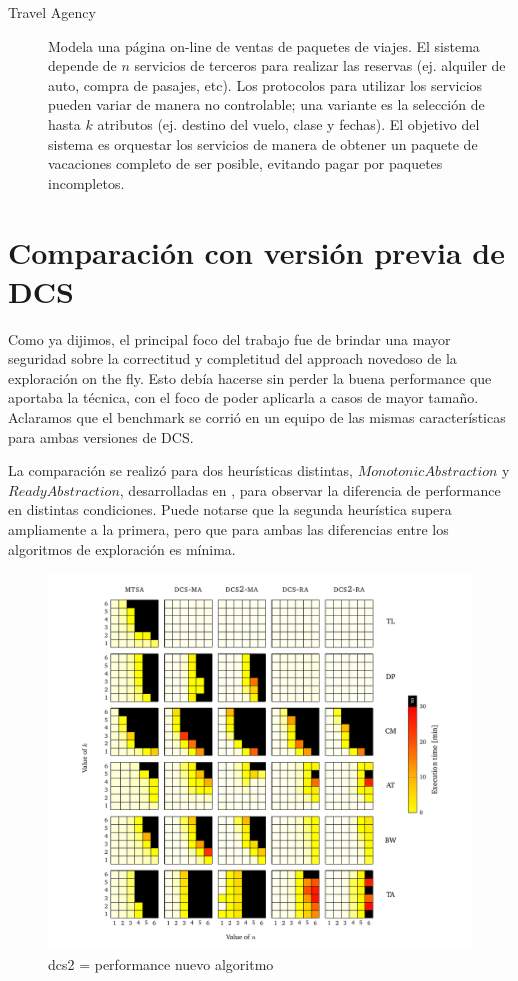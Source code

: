 \begin{description}
    \item [Travel Agency] Modela una página on-line de ventas de paquetes de viajes. El sistema depende de $n$ servicios de terceros para realizar las reservas (ej. alquiler de auto, compra de pasajes, etc). Los protocolos para utilizar los servicios pueden variar de manera no controlable; una variante es la selección de hasta $k$ atributos (ej. destino del vuelo, clase y fechas). El objetivo del sistema es orquestar los servicios de manera de obtener un paquete de vacaciones completo de ser posible, evitando pagar por paquetes incompletos.
\end{description}

\section{Comparación con versión previa de DCS}
Como ya dijimos, el principal foco del trabajo fue de brindar una mayor seguridad sobre la correctitud y completitud del approach novedoso de la exploración on the fly. Esto debía hacerse sin perder la buena performance que aportaba la técnica, con el foco de poder aplicarla a casos de mayor tamaño. Aclaramos que el benchmark se corrió en un equipo de las mismas características para ambas versiones de DCS.

La comparación se realizó para dos heurísticas distintas, $Monotonic Abstraction$ y $Ready Abstraction$, desarrolladas en \cite{tesisDani}, para observar la diferencia de performance en distintas condiciones. Puede notarse que la segunda heurística supera ampliamente a la primera, pero que para ambas las diferencias entre los algoritmos de exploración es mínima.

\begin{figure}[htb]
    \centering
    \includegraphics[width=\linewidth]{figures/dcs_vs.pdf}  
    \caption{dcs2 = performance nuevo algoritmo}
    \label{fig:dcs_vs}
\end{figure}


